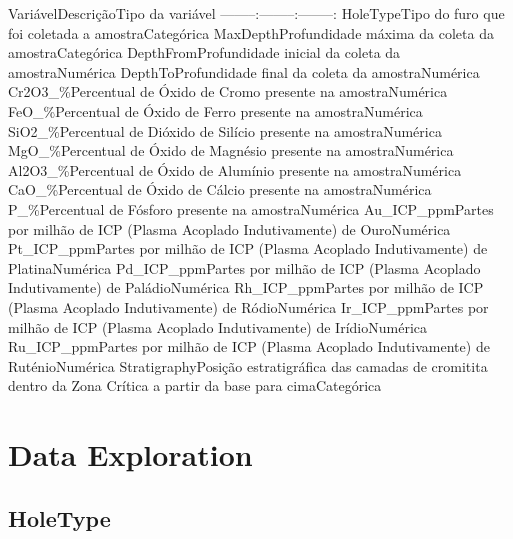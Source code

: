 \documentclass[
]{article}
\begin{document}
\textbar Variável\textbar Descrição\textbar Tipo da variável\textbar{}
\textbar--------:--------:\textbar--------:\textbar{}
\textbar HoleType\textbar Tipo do furo que foi coletada a amostra\textbar Categórica\textbar{}
\textbar MaxDepth\textbar Profundidade máxima da coleta da amostra\textbar Categórica\textbar{}
\textbar DepthFrom\textbar Profundidade inicial da coleta da amostra\textbar Numérica\textbar{}
\textbar DepthTo\textbar Profundidade final da coleta da amostra\textbar Numérica\textbar{}
\textbar Cr2O3\_\%\textbar Percentual de Óxido de Cromo presente na amostra\textbar Numérica\textbar{}
\textbar FeO\_\%\textbar Percentual de Óxido de Ferro presente na amostra\textbar Numérica\textbar{}
\textbar SiO2\_\%\textbar Percentual de Dióxido de Silício presente na amostra\textbar Numérica\textbar{}
\textbar MgO\_\%\textbar Percentual de Óxido de Magnésio presente na amostra\textbar Numérica\textbar{}
\textbar Al2O3\_\%\textbar Percentual de Óxido de Alumínio presente na amostra\textbar Numérica\textbar{}
\textbar CaO\_\%\textbar Percentual de Óxido de Cálcio presente na amostra\textbar Numérica\textbar{}
\textbar P\_\%\textbar Percentual de Fósforo presente na amostra\textbar Numérica\textbar{}
\textbar Au\_ICP\_ppm\textbar Partes por milhão de ICP (Plasma Acoplado Indutivamente) de Ouro\textbar Numérica\textbar{}
\textbar Pt\_ICP\_ppm\textbar Partes por milhão de ICP (Plasma Acoplado Indutivamente) de Platina\textbar Numérica\textbar{}
\textbar Pd\_ICP\_ppm\textbar Partes por milhão de ICP (Plasma Acoplado Indutivamente) de Paládio\textbar Numérica\textbar{}
\textbar Rh\_ICP\_ppm\textbar Partes por milhão de ICP (Plasma Acoplado Indutivamente) de Ródio\textbar Numérica\textbar{}
\textbar Ir\_ICP\_ppm\textbar Partes por milhão de ICP (Plasma Acoplado Indutivamente) de Irídio\textbar Numérica\textbar{}
\textbar Ru\_ICP\_ppm\textbar Partes por milhão de ICP (Plasma Acoplado Indutivamente) de Ruténio\textbar Numérica\textbar{}
\textbar Stratigraphy\textbar Posição estratigráfica das camadas de cromitita dentro da Zona Crítica a partir da base para cima\textbar Categórica\textbar{}

\newpage

\hypertarget{data-exploration}{%
\section{Data Exploration}\label{data-exploration}}

\hypertarget{holetype}{%
\subsection{HoleType}\label{holetype}}
\end{document}
